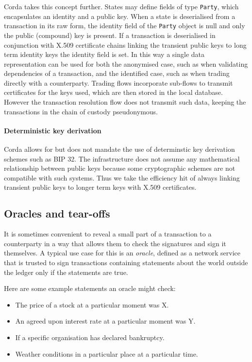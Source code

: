 \documentclass{article}
\begin{document}
Corda takes this concept further. States may define fields of type \texttt{Party}, which encapsulates an identity
and a public key. When a state is deserialised from a transaction in its raw form, the identity field of the
\texttt{Party} object is null and only the public (compound) key is present. If a transaction is deserialised
in conjunction with X.509 certificate chains linking the transient public keys to long term identity keys the
identity field is set. In this way a single data representation can be used for both the anonymised case, such
as when validating dependencies of a transaction, and the identified case, such as when trading directly with
a counterparty. Trading flows incorporate sub-flows to transmit certificates for the keys used, which are then
stored in the local database. However the transaction resolution flow does not transmit such data, keeping the
transactions in the chain of custody pseudonymous.

\paragraph{Deterministic key derivation} Corda allows for but does not mandate the use of determinstic key
derivation schemes such as BIP 32\cite{BIP32}. The infrastructure does not assume any mathematical relationship
between public keys because some cryptographic schemes are not compatible with such systems. Thus we take the
efficiency hit of always linking transient public keys to longer term keys with X.509 certificates.


\subsection{Oracles and tear-offs}\label{sec:tear-offs}

It is sometimes convenient to reveal a small part of a transaction to a counterparty in a way that allows them
to check the signatures and sign it themselves. A typical use case for this is an \emph{oracle}, defined as a
network service that is trusted to sign transactions containing statements about the world outside the ledger
only if the statements are true.

Here are some example statements an oracle might check:

\begin{itemize}
\item The price of a stock at a particular moment was X.
\item An agreed upon interest rate at a particular moment was Y.
\item If a specific organisation has declared bankruptcy.
\item Weather conditions in a particular place at a particular time.
\end{itemize}
\end{document}
